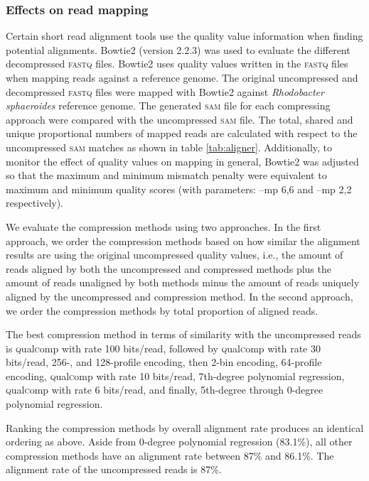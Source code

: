 \documentclass[12pt,\mydriver]{thesis}
\begin{document}
\subsubsection{Effects on read mapping}

Certain short read alignment tools use the quality value
information when finding potential alignments. Bowtie2 (version 2.2.3)
was used to evaluate the different decompressed \textsc{fastq}
files. Bowtie2 uses quality values written in the \textsc{fastq} files
when mapping reads against a reference genome. The original
uncompressed and decompressed \textsc{fastq} files were mapped with
Bowtie2 against \textit{Rhodobacter sphaeroides} reference genome. The
generated \textsc{sam} file for each compressing approach were
compared with the uncompressed \textsc{sam} file. The total, shared
and unique proportional numbers of mapped reads are calculated with
respect to the uncompressed \textsc{sam} matches as shown in table
\ref{tab:aligner}. Additionally, to monitor the effect of quality
values on mapping in general, Bowtie2 was adjusted so that the maximum
and minimum mismatch penalty were equivalent to maximum and minimum
quality scores (with parameters: --mp 6,6 and --mp 2,2 respectively).

We evaluate the compression methods using two approaches. In the
first approach, we order the compression methods based on how similar
the alignment results are using the original uncompressed quality values, i.e., the
amount of reads aligned by both the uncompressed and compressed
methods plus the amount of reads unaligned by both methods minus the
amount of reads uniquely aligned by the uncompressed and compression
method. In the second approach, we order the compression methods by
total proportion of aligned reads.

The best compression method in terms of similarity with the
uncompressed reads is \textsc{q}ual\textsc{c}omp with rate 100 bits/read, followed by
\textsc{q}ual\textsc{c}omp with rate 30 bits/read, 256-, and 128-profile encoding, then
2-bin encoding, 64-profile encoding, \textsc{q}ual\textsc{c}omp with rate 10 bits/read,
7th-degree polynomial regression, \textsc{q}ual\textsc{c}omp with rate 6 bits/read, and
finally, 5th-degree through 0-degree polynomial regression.

Ranking the compression methods by overall alignment rate produces an
identical ordering as above. Aside from 0-degree polynomial
regression (83.1\%), all other compression methods have an alignment
rate between 87\% and 86.1\%. The alignment rate of the uncompressed
reads is 87\%.
\end{document}
